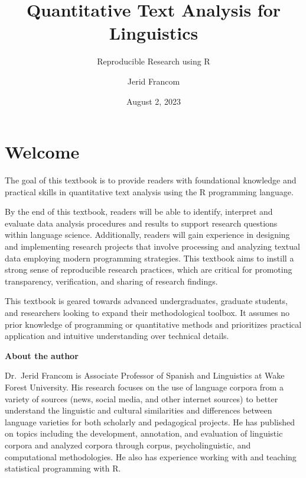 \documentclass[
  letterpaper,
  DIV=11,
  numbers=noendperiod]{scrreport}
\title{Quantitative Text Analysis for Linguistics}
\subtitle{Reproducible Research using R}
\author{Jerid Francom}
\date{August 2, 2023}
\renewcommand*\contentsname{Table of contents}
\newcommand\contentsname{Table of contents}
\theoremstyle{definition}
\theoremstyle{remark}
\begin{document}
\maketitle
\ifdefined\Shaded\renewenvironment{Shaded}{\begin{tcolorbox}[breakable, sharp corners, colback={codebgcolor}, boxrule=0pt, borderline west={3pt}{0pt}{shadecolor}, frame hidden, enhanced]}{\end{tcolorbox}}\fi

\renewcommand*\contentsname{Table of contents}
{
\setcounter{tocdepth}{2}
\tableofcontents
}

\hypertarget{welcome}{%
\chapter*{Welcome}\label{welcome}}


The goal of this textbook is to provide readers with foundational
knowledge and practical skills in quantitative text analysis using the R
programming language.

By the end of this textbook, readers will be able to identify, interpret
and evaluate data analysis procedures and results to support research
questions within language science. Additionally, readers will gain
experience in designing and implementing research projects that involve
processing and analyzing textual data employing modern programming
strategies. This textbook aims to instill a strong sense of reproducible
research practices, which are critical for promoting transparency,
verification, and sharing of research findings.

This textbook is geared towards advanced undergraduates, graduate
students, and researchers looking to expand their methodological
toolbox. It assumes no prior knowledge of programming or quantitative
methods and prioritizes practical application and intuitive
understanding over technical details.

\textbf{About the author}

Dr.~Jerid Francom is Associate Professor of Spanish and Linguistics at
Wake Forest University. His research focuses on the use of language
corpora from a variety of sources (news, social media, and other
internet sources) to better understand the linguistic and cultural
similarities and differences between language varieties for both
scholarly and pedagogical projects. He has published on topics including
the development, annotation, and evaluation of linguistic corpora and
analyzed corpora through corpus, psycholinguistic, and computational
methodologies. He also has experience working with and teaching
statistical programming with R.
\end{document}
